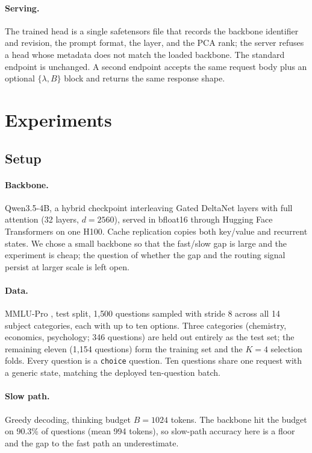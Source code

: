 \documentclass{article}
\begin{document}
\paragraph{Serving.}
The trained head is a single safetensors file that records the backbone identifier and revision, the prompt format, the layer, and the PCA rank; the server refuses a head whose metadata does not match the loaded backbone. The standard endpoint is unchanged. A second endpoint accepts the same request body plus an optional $\{\lambda,B\}$ block and returns the same response shape.

\section{Experiments}
\label{sec:experiments}

\subsection{Setup}

\paragraph{Backbone.}
Qwen3.5-4B, a hybrid checkpoint interleaving Gated DeltaNet layers \citep{yang2024gateddelta} with full attention (32 layers, $d=2560$), served in bfloat16 through Hugging Face Transformers \citep{wolf2020transformers} on one H100. Cache replication copies both key/value and recurrent states. We chose a small backbone so that the fast/slow gap is large and the experiment is cheap; the question of whether the gap and the routing signal persist at larger scale is left open.

\paragraph{Data.}
MMLU-Pro \citep{wang2024mmlupro}, test split, 1{,}500 questions sampled with stride 8 across all 14 subject categories, each with up to ten options. Three categories (chemistry, economics, psychology; 346 questions) are held out entirely as the test set; the remaining eleven (1{,}154 questions) form the training set and the $K=4$ selection folds. Every question is a \texttt{choice} question. Ten questions share one request with a generic state, matching the deployed ten-question batch.

\paragraph{Slow path.}
Greedy decoding, thinking budget $B=1024$ tokens. The backbone hit the budget on 90.3\% of questions (mean 994 tokens), so slow-path accuracy here is a floor and the gap to the fast path an underestimate.
\end{document}
